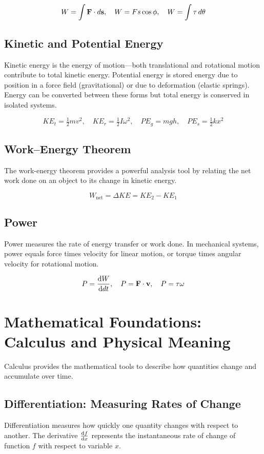 \documentclass[11pt,a4paper]{article}
\begin{document}
\[
W = \int \vb{F} \cdot d\vb{s}, \quad W = Fs\cos\phi, \quad W = \int \tau\, d\theta
\]

\subsection*{Kinetic and Potential Energy}
Kinetic energy is the energy of motion—both translational and rotational motion contribute to total kinetic energy. Potential energy is stored energy due to position in a force field (gravitational) or due to deformation (elastic springs). Energy can be converted between these forms but total energy is conserved in isolated systems.

\[
KE_t = \tfrac12 m v^2, \quad KE_r = \tfrac12 I \omega^2, \quad
PE_g = mgh, \quad PE_s = \tfrac12 kx^2
\]

\subsection*{Work--Energy Theorem}
The work-energy theorem provides a powerful analysis tool by relating the net work done on an object to its change in kinetic energy. 

\begin{eqbox}
\[
W_{\text{net}} = \Delta KE = KE_2 - KE_1
\]
\end{eqbox}

\subsection*{Power}
Power measures the rate of energy transfer or work done. In mechanical systems, power equals force times velocity for linear motion, or torque times angular velocity for rotational motion. 

\[
P = \dv{W}{dt}, \quad P = \vb{F} \cdot \vb{v}, \quad
P = \tau \omega
\]



\section{Mathematical Foundations: Calculus and Physical Meaning}

Calculus provides the mathematical tools to describe how quantities change and accumulate over time.

\subsection*{Differentiation: Measuring Rates of Change}
Differentiation measures how quickly one quantity changes with respect to another. The derivative $\dv{f}{x}$ represents the instantaneous rate of change of function $f$ with respect to variable $x$.
\end{document}
